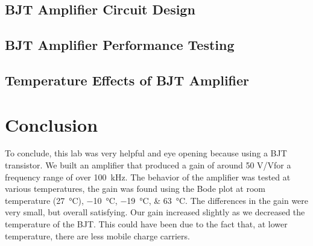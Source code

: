 \documentclass[journal]{IEEEtran}
\begin{document}
\subsection{BJT Amplifier Circuit Design}
\subsection{BJT Amplifier Performance Testing}
\subsection{Temperature Effects of BJT Amplifier}

\section{Conclusion}
\par To conclude, this lab was very helpful and eye opening because using a BJT transistor. We built an amplifier that produced a gain of around 50 \si{\volt}/\si{\volt}for a frequency range of over \SI{100}{\kilo\hertz}.
The behavior of the amplifier was tested at various temperatures, the gain was found using the Bode plot at room temperature (\SI{27}{\celsius}), \SIlist{-10;-19;63}{\celsius}. The differences in the gain were very small, but overall satisfying. Our gain increased slightly as we decreased the temperature of the BJT. This could have been due to the fact that, at lower temperature, there are less mobile charge carriers.
\end{document}
